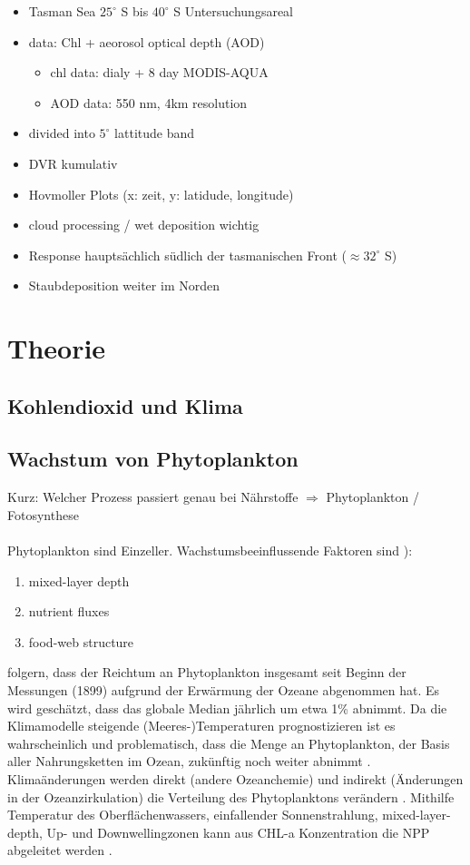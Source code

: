 \documentclass[12pt,a4paper,onecolumn]{scrartcl}
\begin{document}
\begin{itemize}
\item Tasman Sea $25^\circ$ S bis $40^\circ$ S Untersuchungsareal
\item data: Chl + aeorosol optical depth (AOD)
\begin{itemize}
\item chl data: dialy + 8 day MODIS-AQUA
\item AOD data: 550 nm, 4km resolution 
\end{itemize}
\item divided into $5^\circ$ lattitude band
\item DVR kumulativ
\item Hovmoller Plots (x: zeit, y: latidude, longitude)
\item cloud processing / wet deposition wichtig
\item Response hauptsächlich südlich der tasmanischen Front ($\approx 32^\circ$ S) 
\item Staubdeposition weiter im Norden

\end{itemize}

\section{Theorie}
\subsection{Kohlendioxid und Klima}
\subsection{Wachstum von Phytoplankton}
Kurz: Welcher Prozess passiert genau bei Nährstoffe $\Rightarrow$ Phytoplankton / Fotosynthese \\\\
Phytoplankton sind Einzeller.
Wachstumsbeeinflussende Faktoren sind \citep{Falkowski.1998}):
\begin{enumerate}
\item mixed-layer depth
\item nutrient fluxes
\item food-web structure
\end{enumerate}
\citet{Boyce.2010} folgern, dass der Reichtum an Phytoplankton insgesamt seit Beginn der Messungen (1899) aufgrund der Erwärmung der Ozeane abgenommen hat. Es wird geschätzt, dass das globale Median jährlich um etwa 1\% abnimmt. Da die Klimamodelle steigende (Meeres-)Temperaturen prognostizieren ist es wahrscheinlich und problematisch, dass die Menge an Phytoplankton, der Basis aller Nahrungsketten im Ozean, zukünftig noch weiter abnimmt \citep{Siegel.2010}. Klimaänderungen werden direkt (andere Ozeanchemie) und indirekt (Änderungen in der Ozeanzirkulation) die Verteilung des Phytoplanktons verändern \citep{Falkowski.1998}. Mithilfe Temperatur des Oberflächenwassers, einfallender Sonnenstrahlung, mixed-layer-depth, Up- und Downwellingzonen kann aus CHL-a Konzentration die NPP abgeleitet werden \citep{Falkowski.1998}.
\end{document}
